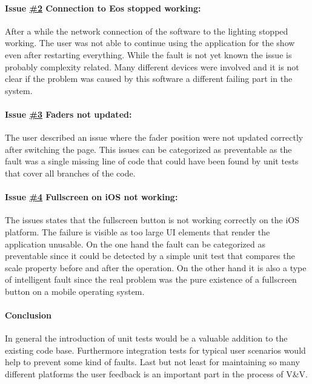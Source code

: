 \documentclass{scrartcl}
\begin{document}
\paragraph{Issue \href{https://github.com/ETCLabs/LuminosusEosEdition/issues/2}{\#2} Connection to Eos stopped working:}

After a while the network connection of the software to the lighting stopped working. The user was not able to continue using the application for the show even after restarting everything.
While the fault is not yet known the issue is probably complexity related. Many different devices were involved and it is not clear if the problem was caused by this software a  different failing part in the system.


\paragraph{Issue \href{https://github.com/ETCLabs/LuminosusEosEdition/issues/3}{\#3} Faders not updated:}

The user described an issue where the fader position were not updated correctly after switching the page.
This issues can be categorized as preventable as the fault was a single missing line of code that could have been found by unit tests that cover all branches of the code.


\paragraph{Issue \href{https://github.com/ETCLabs/LuminosusEosEdition/issues/4}{\#4} Fullscreen on iOS not working:}

The issues states that the fullscreen button is not working correctly on the iOS platform. The failure is visible as too large UI elements that render the application unusable.
On the one hand the fault can be categorized as preventable since it could be detected by a simple unit test that compares the scale property before and after the operation.
On the other hand it is also a type of intelligent fault since the real problem was the pure existence of a fullscreen button on a mobile operating system.

\paragraph{Conclusion}
In general the introduction of unit tests would be a valuable addition to the existing code base. Furthermore integration tests for typical user scenarios would help to prevent some kind of faults. Last but not least for maintaining so many different platforms the user feedback is an important part in the process of V\&V.
\end{document}
